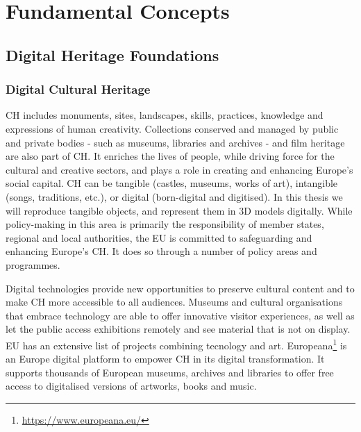 
%

\chapter{Fundamental Concepts}
\label{cha:fundamental_concepts}

\section{Digital Heritage Foundations}
\label{sec:digital_heritage_foundation}

\subsection{Digital Cultural Heritage}
\label{sec:digital_heritage}

\gls{CH} includes monuments, sites, landscapes, skills, practices, knowledge and expressions of human creativity. Collections conserved and managed by public and private bodies - such as museums, libraries and archives - and film heritage are also part of CH. It enriches the lives of people, while driving force for the cultural and creative sectors, and plays a role in creating and enhancing Europe's social capital.
\gls{CH} can be tangible (castles, museums, works of art), intangible (songs, traditions, etc.), or
digital (born-digital and digitised). In this thesis we will reproduce tangible objects, and represent them in \gls{3D} models digitally.
While policy-making in this area is primarily the responsibility of member states, regional and local authorities, the \gls{EU} is committed to safeguarding and enhancing Europe's \gls{CH}. It does so through a number of policy areas and programmes.~\cite{eu_cultural_heritage} 


Digital technologies provide new opportunities to preserve cultural content and to make \gls{CH} more accessible to all audiences. Museums and cultural organisations that embrace technology are able to offer innovative visitor experiences, as well as let the public access exhibitions remotely and see material that is not on display.
\gls{EU} has an extensive list of projects combining tecnology and art.
Europeana\footnote{\url{https://www.europeana.eu/}} is an Europe digital platform to empower \gls{CH} in its digital transformation. It supports thousands of European museums, archives and libraries to offer free access to digitalised versions of artworks, books and music.~\cite{eu_digital_heritage} 

